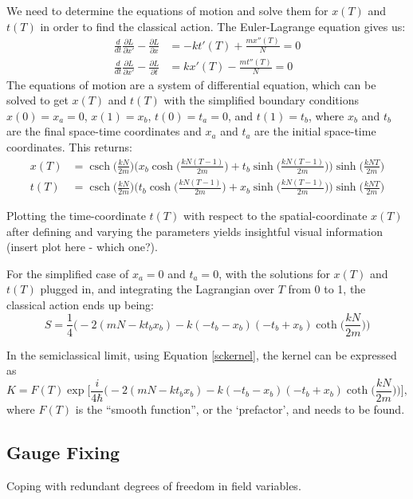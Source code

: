\documentclass[12pt]{revtex4}
\DeclareMathOperator{\csch}{csch}
\begin{document}
We need to determine the equations of motion and solve them for $x(T)$ and $t(T)$ in order to find the classical action. The Euler-Lagrange equation gives us:
\begin{align*}
\frac{d}{dt}\frac{\partial L}{\partial x'}-\frac{\partial L}{\partial x} &= -k t'(T) + \frac{m x''(T)}{N} =0\\
\frac{d}{dt}\frac{\partial L}{\partial x'}-\frac{\partial L}{\partial t} &= k x'(T) - \frac{m t''(T)}{N} =0
\end{align*}
The equations of motion are a system of differential equation, which can be solved to get $x(T)$ and $t(T)$ with the simplified boundary conditions $x(0) = x_a = 0$, $x(1)=x_b$, $t(0) = t_a = 0$, and $t(1)=t_b$, where $x_b$ and $t_b$ are the final space-time coordinates and $x_a$ and $t_a$ are the initial space-time coordinates. This returns:
\begin{align*}
x(T) &= \csch \bigg(\frac{k N}{2 m}\bigg) \Biggr(x_b \cosh\bigg(\frac{k N (T-1)}{2m}\bigg)+ 
t_b \sinh\bigg(\frac{k N (T-1)}{2m}\bigg)\Biggr) \sinh\bigg(\frac{k N T}{2m}\bigg)\\
t(T)&= \csch \bigg(\frac{k N}{2 m}\bigg) \Biggr(t_b \cosh\bigg(\frac{k N (T-1)}{2m}\bigg)+ 
x_b \sinh\bigg(\frac{k N (T-1)}{2m}\bigg)\Biggr) \sinh\bigg(\frac{k N T}{2m}\bigg)
\end{align*} 

Plotting the time-coordinate $t(T)$ with respect to the spatial-coordinate $x(T)$ after defining and varying the parameters yields insightful visual information (insert plot here - which one?).

For the simplified case of $x_a=0$ and $t_a=0$, with the solutions for $x(T)$ and $t(T)$ plugged in, and integrating the Lagrangian over $T$ from 0 to 1, the classical action ends up being:
\begin{equation*}
S = \frac{1}{4} \Bigg(-2 (m N - k t_b x_b) - k (-t_b - x_b) (-t_b + x_b) \coth\bigg(\frac{k N}{2 m}\bigg)\Bigg)
\end{equation*} 

In the semiclassical limit, using Equation \ref{sckernel}, the kernel can be expressed as 
\[ K=F(T) \exp \Bigg[\frac{i}{4 \hbar} \Bigg(-2 (m N - k t_b x_b) - k (-t_b - x_b) (-t_b + x_b) \coth\bigg(\frac{k N}{2 m}\bigg)\Bigg)\Bigg],\]
where $F(T)$ is the ``smooth function'', or the `prefactor', and needs to be found. 

\subsection{Gauge Fixing} \label{gauge}
Coping with redundant degrees of freedom in field variables.
\end{document}
